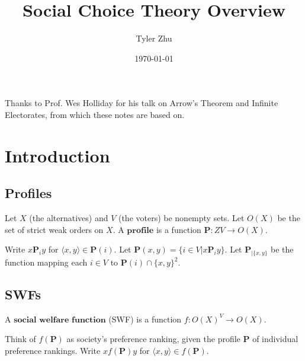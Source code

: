 \documentclass[11 pt]{scrartcl}
\newcommand{\arttitle}{Social Choice Theory Overview}
\newcommand{\BP}{\mathbf{P}}
\begin{document}
\title{\Large \arttitle{}}
\author{\large Tyler Zhu}
\date{\large\today}
\maketitle

Thanks to Prof. Wes Holliday for his talk on Arrow's Theorem and Infinite Electorates, from which these notes are based on.

\section{Introduction}
\subsection{Profiles}
    Let $X$ (the alternatives) and $V$ (the voters) be nonempty sets. Let $O(X)$ be the set of strict weak orders on $X$.
    A $\textbf{profile}$ is a function $\mathbf{P}:ZV\to O(X)$.
    \begin{itemize}
        \ii Write $x\BP_i y$ for $\langle x,y\rangle \in \BP(i)$.
        \ii Let $\BP(x,y) = \{i\in V | x\BP_iy\}$.
        \ii Let $\BP_{|\{x,y\}}$ be the function mapping each $i\in V$ to $\BP(i) \cap \{x,y\}^2$.
    \end{itemize}

\subsection{SWFs}
A $\textbf{social welfare function}$ (SWF) is a function $f: O(X)^V \to O(X)$.
\begin{itemize}
    \ii Think of $f(\BP)$ as society's preference ranking, given the profile $\BP$ of individual preference rankings.
    \ii Write $xf(\BP)y$ for $\langle x,y\rangle \in f(\BP)$.
\end{itemize}
\end{document}

